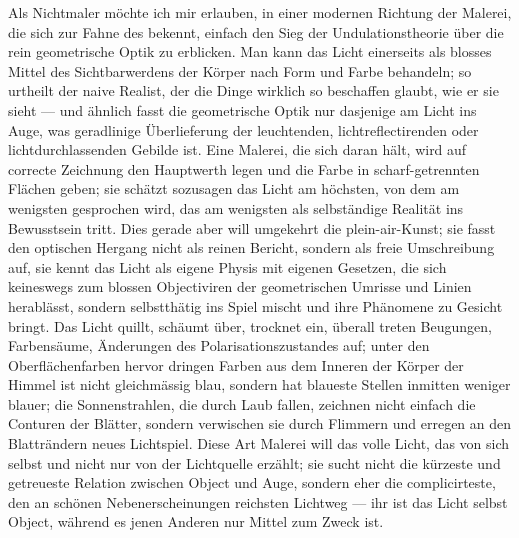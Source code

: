 Als Nichtmaler möchte ich mir erlauben, in einer modernen Richtung der Malerei, die sich zur Fahne des   bekennt, einfach den Sieg der Undulationstheorie über die rein geometrische Optik zu erblicken. Man kann das Licht einerseits als blosses Mittel des Sichtbarwerdens der Körper nach Form und Farbe behandeln; so urtheilt der naive Realist, der die Dinge wirklich so beschaffen glaubt, wie er sie sieht — und ähnlich fasst die geometrische Optik nur dasjenige am Licht ins Auge, was geradlinige Überlieferung der leuchtenden, lichtreflectirenden oder lichtdurchlassenden Gebilde ist. Eine Malerei, die sich daran hält, wird auf correcte Zeichnung den Hauptwerth legen und die Farbe in scharf-getrennten Flächen geben; sie schätzt sozusagen das Licht am höchsten, von dem am wenigsten gesprochen wird, das am wenigsten als selbständige Realität ins Bewusstsein tritt. Dies gerade aber will umgekehrt die plein-air-Kunst; sie fasst den optischen Hergang nicht als reinen Bericht, sondern als freie Umschreibung auf, sie kennt das Licht als eigene Physis mit eigenen Gesetzen, die sich keineswegs zum blossen Objectiviren der geometrischen Umrisse und Linien herablässt, sondern selbstthätig ins Spiel mischt und ihre Phänomene zu Gesicht bringt. Das Licht quillt, schäumt über, trocknet ein, überall treten Beugungen, Farbensäume, Änderungen des Polarisationszustandes auf; unter den Oberflächenfarben hervor dringen Farben aus dem Inneren der Körper der Himmel ist nicht gleichmässig blau, sondern hat blaueste Stellen inmitten weniger blauer; die Sonnenstrahlen, die durch Laub fallen, zeichnen nicht einfach die Conturen der Blätter, sondern verwischen sie durch Flimmern und erregen an den Blatträndern neues Lichtspiel. Diese Art Malerei will das volle Licht, das von sich selbst und nicht nur von der Lichtquelle erzählt; sie sucht nicht die kürzeste und getreueste Relation zwischen Object und Auge, sondern eher die complicirteste, den an schönen Nebenerscheinungen reichsten Lichtweg — ihr ist das Licht selbst Object, während es jenen Anderen nur Mittel zum Zweck ist.
\par

